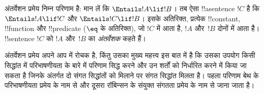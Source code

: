 \documentclass[../../../include/open-logic-section]{subfiles}
\begin{document}


अंतर्वेशन प्रमेय निम्न परिणाम है: मान लें कि
$\Entails !A \lif !B$। तब ऐसा !!a{sentence} $!C$ है कि
$\Entails !A \lif !C$ और $\Entails !C \lif !B$। इसके अतिरिक्त, प्रत्येक
!!{constant}, !!{function} और !!{predicate} ($\eq$ के अतिरिक्त), जो
$!C$ में आता है, $!A$ और~$!B$ दोनों में आता है। !!{sentence} $!C$
को $!A$ और~$!B$ का \emph{अंतर्वेशक} कहते हैं।

अंतर्वेशन प्रमेय अपने आप में रोचक है, किंतु उसका मुख्य महत्त्व इस बात में
है कि उसका उपयोग किसी सिद्धांत में परिभाषणीयता के बारे में परिणाम सिद्ध
करने और उन शर्तों को निर्धारित करने में किया जा सकता है जिनके अंतर्गत दो
संगत सिद्धांतों को मिलाने पर संगत सिद्धांत मिलता है। पहला परिणाम बेथ के
परिभाषणीयता प्रमेय के नाम से और दूसरा रॉबिन्सन के संयुक्त संगतता प्रमेय के
नाम से जाना जाता है।
\end{document}
